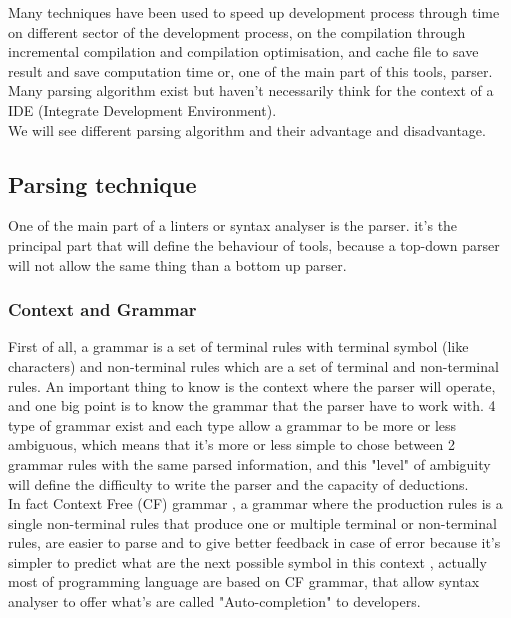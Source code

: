 Many techniques have been used to speed up development process through time on different sector of the development process, on the compilation through incremental compilation and compilation optimisation, and cache file to save result and save computation time or, one of the main part of this tools, parser.
Many parsing algorithm exist but haven't necessarily think for the context of a IDE (Integrate Development Environment).
\\We will see different parsing algorithm and their advantage and disadvantage.
\subsection{Parsing technique}
One of the main part of a linters or syntax analyser is the parser. it's the principal part that will define the behaviour of tools, because a top-down parser will not allow the same thing than a bottom up parser.

\subsubsection{Context and Grammar}
First of all, a grammar is a set of terminal rules with terminal symbol (like characters) and non-terminal rules which are a set of terminal and non-terminal rules.
An important thing to know is the context where the parser will operate, and one big point is to know the grammar that the parser have to work with. 4 type of grammar exist\cite{grune2008parsing} and each type allow a grammar to be more or less ambiguous, which means that it's more or less simple to chose between 2 grammar rules with the same parsed information, and this "level" of ambiguity will define the difficulty to write the parser and the capacity of deductions.
\\In fact Context Free (CF) grammar \cite{cfg_def}, a grammar where the production rules is a single non-terminal rules that produce one or multiple terminal or non-terminal rules, are easier to parse and to give better feedback in case of error because it's simpler to predict what are the next possible symbol in this context \cite{grune2008parsing}, actually most of programming language are based on CF grammar, that allow syntax analyser to offer what's are called "Auto-completion" to developers. 

